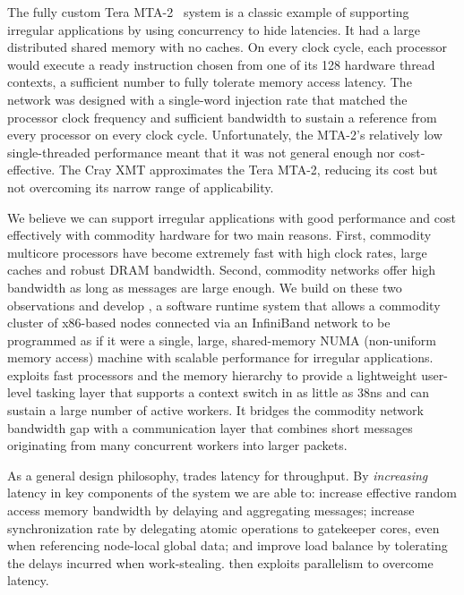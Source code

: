 The fully custom Tera MTA-2~\cite{tera:mta1,Alverson:1992:EHP:143369.143408} system is a classic example of
supporting irregular applications by using concurrency to hide latencies. It
had a large distributed shared memory with no caches. On every clock cycle,
each processor would execute a ready instruction chosen from one of its 128
hardware thread contexts, a sufficient number to fully tolerate memory access
latency. The network was designed with a single-word injection rate that
matched the processor clock frequency and sufficient bandwidth to sustain a
reference from every processor on every clock cycle. Unfortunately, the MTA-2's relatively low single-threaded performance meant that it
was not general enough nor cost-effective. The Cray XMT approximates the Tera
MTA-2, reducing its cost but not overcoming its narrow range of applicability.

We believe we can support irregular applications with good performance and cost effectively with commodity hardware for two main reasons. First, commodity multicore processors have become extremely fast with high clock rates, large caches and robust DRAM bandwidth. Second, commodity networks offer high bandwidth as long as messages are large enough. We build on these two observations and develop \Grappa, a software runtime system that allows a commodity cluster of x86-based nodes connected via an InfiniBand network to be programmed as if it were a single, large, shared-memory NUMA (non-uniform memory access) machine with scalable performance for irregular applications. \Grappa exploits fast processors and the memory hierarchy to provide a lightweight user-level tasking layer that supports a context switch in as little as 38ns and can sustain a large number of active workers. It bridges the commodity network bandwidth gap with a communication layer that combines short messages originating from many concurrent workers into larger packets.

As a general design philosophy, \Grappa trades latency for throughput.  By \emph{increasing} latency in key components of the system we are able to: increase effective random access memory bandwidth by delaying and aggregating messages; increase synchronization rate by delegating atomic operations to gatekeeper cores, even when referencing node-local global data; and improve load balance by tolerating the delays incurred when work-stealing.  \Grappa then exploits parallelism to overcome latency.

